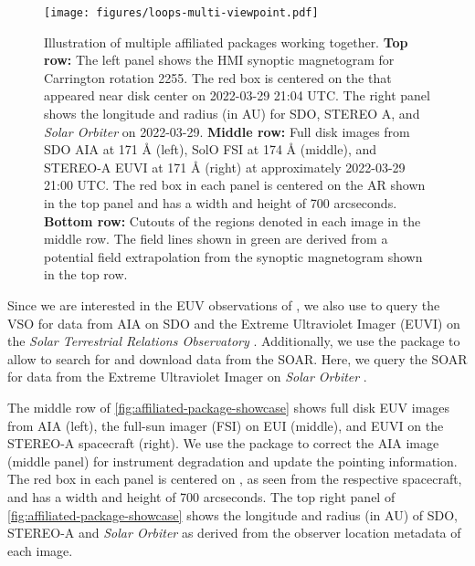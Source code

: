 \begin{figure}
    \centering
    \texttt{[image: figures/loops-multi-viewpoint.pdf]}
    \caption{Illustration of multiple affiliated packages working together.
             \textbf{Top row:} The left panel shows the HMI synoptic magnetogram for Carrington rotation 2255. The red box is centered on the \AR that appeared near disk center on 2022-03-29 21:04 UTC. The right panel shows the \hgs longitude and radius (in AU) for SDO, STEREO A, and \textit{Solar Orbiter} on 2022-03-29.
             \textbf{Middle row:} Full disk images from SDO AIA at 171 Å (left), SolO FSI at 174 Å (middle), and STEREO-A EUVI at 171 Å (right) at approximately 2022-03-29 21:00 UTC.
             The red box in each panel is centered on the AR shown in the top panel and has a width and height of 700 arcseconds.
             \textbf{Bottom row:} Cutouts of the regions denoted in each image in the middle row.
             The field lines shown in green are derived from a potential field extrapolation from the synoptic magnetogram shown in the top row.
    }
    \label{fig:affiliated-package-showcase}
\end{figure}

Since we are interested in the EUV observations of , we also use \Fido to query the VSO for data from AIA on SDO and the Extreme Ultraviolet Imager (EUVI) on the \textit{Solar Terrestrial Relations Observatory} \citep[STEREO,][]{howard_sun_2008}.
Additionally, we use the  package to allow \Fido to search for and download data from the SOAR.
Here, we query the SOAR for data from the Extreme Ultraviolet Imager \citep[EUI,][]{rochus_solar_2020} on \textit{Solar Orbiter} \citep{muller_solar_2020}.

The middle row of \autoref{fig:affiliated-package-showcase} shows full disk EUV images from AIA (left), the full-sun imager (FSI) on EUI (middle), and EUVI on the STEREO-A spacecraft (right).
We use the \aiapypkg package to correct the AIA image (middle panel) for instrument degradation and update the pointing information.
The red box in each panel is centered on , as seen from the respective spacecraft, and has a width and height of 700 arcseconds.
The top right panel of \autoref{fig:affiliated-package-showcase} shows the \hgs longitude and radius (in AU) of SDO, STEREO-A and \textit{Solar Orbiter} as derived from the observer location metadata of each image.

